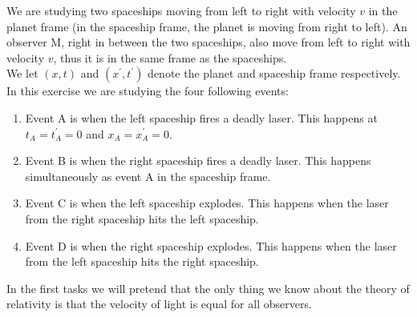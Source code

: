 \documentclass[a4paper,10pt,english]{article}
\begin{document}
We are studying two spaceships moving from left to right with velocity $v$ in the planet frame (in the spaceship frame, the planet is moving from right to left). An observer M, right in between the two spaceships, also move from left to right with velocity $v$, thus it is in the same frame as the spaceships.
\\
We let $(x,t)$ and $(x^{\prime},t^{\prime})$ denote the planet and spaceship frame respectively. In this exercise we are studying the four following events:
\begin{enumerate} %
\item Event A is when the left spaceship fires a deadly laser. This happens at $t_{A}=t_{A}^{\prime}=0$ and $x_{A}=x_{A}^{\prime}=0$.
\item Event B is when the right spaceship fires a deadly laser. This happens simultaneously as event A in the spaceship frame.
\item Event C is when the left spaceship explodes. This happens when the laser from the right spaceship hits the left spaceship.
\item Event D is when the right spaceship explodes. This happens when the laser from the left spaceship hits the right spaceship.
\end{enumerate} %

In the first tasks we will pretend that the only thing we know about the theory of relativity is that the velocity of light is equal for all observers.
\end{document}
